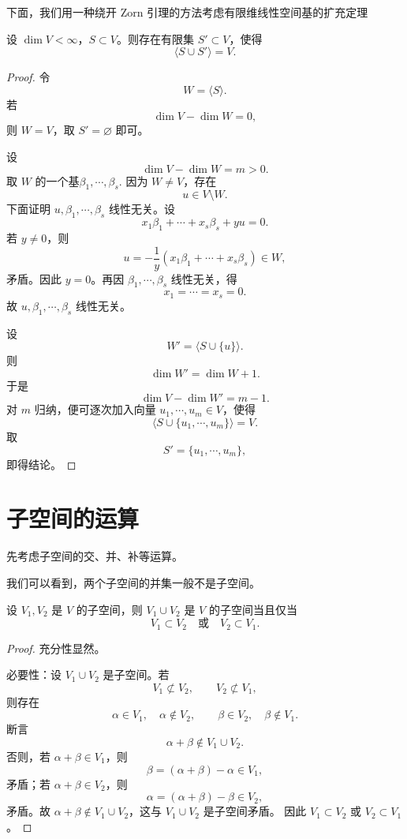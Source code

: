 下面，我们用一种绕开 Zorn 引理的方法考虑有限维线性空间基的扩充定理

\begin{proposition}
	设 $\dim V<\infty$，$S\subset V$。则存在有限集 $S'\subset V$，使得
	\[
	\langle S\cup S'\rangle=V.
	\]
\end{proposition}

\begin{proof}
	令
	\[
	W=\langle S\rangle.
	\]
	若
	\[
	\dim V-\dim W=0,
	\]
	则 $W=V$，取 $S'=\varnothing$ 即可。
	
	设
	\[
	\dim V-\dim W=m>0.
	\]
	取 $W$ 的一个基$ \beta_1,\cdots,\beta_s.$
	因为 $W\neq V$，存在
	\[
	u\in V\setminus W.
	\]
	下面证明 $u,\beta_1,\cdots,\beta_s$ 线性无关。设
	\[
	x_1\beta_1+\cdots+x_s\beta_s+yu=0.
	\]
	若 $y\neq0$，则
	\[
	u=-\frac{1}{y}(x_1\beta_1+\cdots+x_s\beta_s)\in W,
	\]
	矛盾。因此 $y=0$。再因 $\beta_1,\cdots,\beta_s$ 线性无关，得
	\[
	x_1=\cdots=x_s=0.
	\]
	故 $u,\beta_1,\cdots,\beta_s$ 线性无关。
	
	设
	\[
	W'=\langle S\cup\{u\}\rangle.
	\]
	则
	\[
	\dim W'=\dim W+1.
	\]
	于是
	\[
	\dim V-\dim W'=m-1.
	\]
	对 $m$ 归纳，便可逐次加入向量 $u_1,\cdots,u_m\in V$，使得
	\[
	\langle S\cup\{u_1,\cdots,u_m\}\rangle=V.
	\]
	取
	\[
	S'=\{u_1,\cdots,u_m\},
	\]
	即得结论。
\end{proof}

\section{子空间的运算}

先考虑子空间的交、并、补等运算。

我们可以看到，两个子空间的并集一般不是子空间。

\begin{proposition}
	设 $V_1,V_2$ 是 $V$ 的子空间，则 $V_1\cup V_2$ 是 $V$ 的子空间当且仅当
	\[
	V_1\subset V_2
	\quad\text{或}\quad
	V_2\subset V_1.
	\]
\end{proposition}

\begin{proof}
	充分性显然。
	
	必要性：设 $V_1\cup V_2$ 是子空间。若
	\[
	V_1\not\subset V_2,
	\qquad
	V_2\not\subset V_1,
	\]
	则存在
	\[
	\alpha\in V_1,\quad \alpha\notin V_2,
	\qquad
	\beta\in V_2,\quad \beta\notin V_1.
	\]
	断言
	\[
	\alpha+\beta\notin V_1\cup V_2.
	\]
	否则，若 $\alpha+\beta\in V_1$，则
	\[
	\beta=(\alpha+\beta)-\alpha\in V_1,
	\]
	矛盾；若 $\alpha+\beta\in V_2$，则
	\[
	\alpha=(\alpha+\beta)-\beta\in V_2,
	\]
	矛盾。故 $\alpha+\beta\notin V_1\cup V_2$，这与 $V_1\cup V_2$ 是子空间矛盾。
	因此 $V_1\subset V_2$ 或 $V_2\subset V_1$。
\end{proof}

